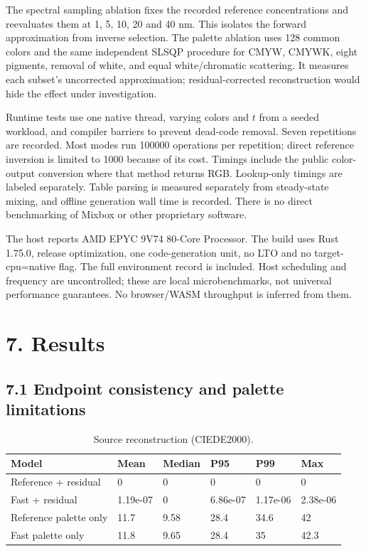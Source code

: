 \documentclass[
  10pt,
  twocolumn]{article}
\begin{document}
The spectral sampling ablation fixes the recorded reference
concentrations and reevaluates them at 1, 5, 10, 20 and 40 nm. This
isolates the forward approximation from inverse selection. The palette
ablation uses 128 common colors and the same independent SLSQP procedure
for CMYW, CMYWK, eight pigments, removal of white, and equal
white/chromatic scattering. It measures each subset's uncorrected
approximation; residual-corrected reconstruction would hide the effect
under investigation.

Runtime tests use one native thread, varying colors and \(t\) from a
seeded workload, and compiler barriers to prevent dead-code removal.
Seven repetitions are recorded. Most modes run 100000 operations per
repetition; direct reference inversion is limited to 1000 because of its
cost. Timings include the public color-output conversion where that
method returns RGB. Lookup-only timings are labeled separately. Table
parsing is measured separately from steady-state mixing, and offline
generation wall time is recorded. There is no direct benchmarking of
Mixbox or other proprietary software.

The host reports AMD EPYC 9V74 80-Core Processor. The build uses Rust
1.75.0, release optimization, one code-generation unit, no LTO and no
target-cpu=native flag. The full environment record is included. Host
scheduling and frequency are uncontrolled; these are local
microbenchmarks, not universal performance guarantees. No browser/WASM
throughput is inferred from them.

\hypertarget{results}{%
\section{7. Results}\label{results}}

\hypertarget{endpoint-consistency-and-palette-limitations}{%
\subsection{7.1 Endpoint consistency and palette
limitations}\label{endpoint-consistency-and-palette-limitations}}

\begin{table}[t]
\caption{Source reconstruction (CIEDE2000).}
\centering\small
\begin{tabular}{@{}llllll@{}}
\toprule\noalign{}
Model & Mean & Median & P95 & P99 & Max \\
\midrule\noalign{}

\bottomrule\noalign{}

Reference + residual & 0 & 0 & 0 & 0 & 0 \\
Fast + residual & 1.19e-07 & 0 & 6.86e-07 & 1.17e-06 & 2.38e-06 \\
Reference palette only & 11.7 & 9.58 & 28.4 & 34.6 & 42 \\
Fast palette only & 11.8 & 9.65 & 28.4 & 35 & 42.3 \\
\end{tabular}
\end{table}
\end{document}
